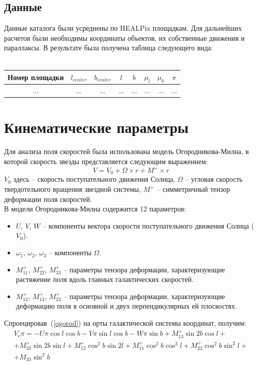 \documentclass[14pt]{article} %
\begin{document}
\subsection{Данные}
Данные каталога были усреднены по HEALPix площадкам. Для дальнейших расчетов были необходимы координаты объектов, их собственные движения и параллаксы. В результате была получена таблица следующего вида:\\\\
\begin{tabular}{|c|c|c|c|c|c|c|c|}
\hline
Номер площадки&$l_{center}$&$b_{center}$&$l$&$b$&$\mu_{l}$&$\mu_{b}$&$\pi$\\
\hline
...&...&...&...&...&...&...&...\\
\hline
\end{tabular}

\section{Кинематические параметры}
Для анализа поля скоростей была использована модель Огородникова-Милна, в которой скорость звезды представляется следующим выражением:
\begin{equation}\label{ogorod}
V=V_0+\Omega\times r+M^+\times r
\end{equation}
$V_0$ здесь -- скорость поступательного движения Солнца, $\Omega$ -- угловая скорость твердотельного вращения звездной системы, $M^+$ -- симметричный тензор деформации поля скоростей.\\
В модели Огородникова-Милна содержится 12 параметров:\\
\begin{itemize}
\item $U$, $V$, $W$ -- компоненты вектора скорости поступательного движения Солнца ($V_0$).
\item $\omega_1$, $\omega_2$, $\omega_3$ -- компоненты $\Omega$.
\item $M^+_{11}$, $M^+_{22}$, $M^+_{33}$ -- параметры тензора деформации, характеризующие растяжение поля вдоль главных галактических скоростей.
\item $M^+_{12}$, $M^+_{13}$, $M^+_{23}$ -- параметры тензора деформации, характеризующие деформацию поля в основной и двух перпендикулярных ей плоскостях.\\
\end{itemize}
Спроецировав~(\ref{ogorod}) на орты галактической системы координат, получим:
\begin{multline}\label{radial}
V_r\pi=-U\pi\cos l\cos b -V\pi\sin l\cos b-W\pi\sin b+M_{13}^+\sin2b\cos l+\\+M_{23}^+\sin2b\sin l+M_{12}^+\cos^2b\sin2l+M_{11}^+\cos^2b\cos^2l+M_{22}^+\cos^2b\sin^2l+\\+M_{33}\sin^2b
\end{multline}
\end{document}
